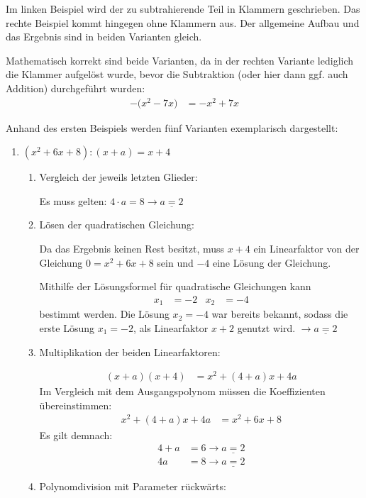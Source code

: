\begin{aufgaben}
\item Im linken Beispiel wird der zu subtrahierende Teil in Klammern geschrieben. Das rechte Beispiel kommt hingegen ohne Klammern aus. Der allgemeine Aufbau und das Ergebnis sind in beiden Varianten gleich.

Mathematisch korrekt sind beide Varianten, da in der rechten Variante lediglich die Klammer aufgelöst wurde, bevor die Subtraktion (oder hier dann ggf. auch Addition) durchgeführt wurden:
\begin{align*}
-\big( x^2-7 x\big) &= -x^2+7x
\end{align*}

\item Anhand des ersten Beispiels werden fünf Varianten exemplarisch dargestellt:
\begin{enumerate}[aa)]
\item $(x^2+6x+8):(x+a) = x+4$
\begin{enumerate}[i:]
\item Vergleich der jeweils letzten Glieder:

Es muss gelten: $4\cdot a = 8 \rightarrow \underline{a = 2}$
\item Lösen der quadratischen Gleichung:

Da das Ergebnis keinen Rest besitzt, muss $x+4$ ein Linearfaktor von der Gleichung  $0=x^2+6x+8$ sein und $-4$ eine Lösung der Gleichung.

Mithilfe der Lösungsformel für quadratische Gleichungen kann
\begin{align*}
x_1&=-2 & x_2&=-4
\end{align*}
bestimmt werden. Die Lösung $x_2=-4$ war bereits bekannt, sodass die erste Lösung $x_1=-2$, als Linearfaktor $x+2$ genutzt wird. $\rightarrow \underline{a=2}$
\item Multiplikation der beiden Linearfaktoren:

\begin{align*}
(x+a)(x+4) &= x^2+(4+a)x+4a
\end{align*}
Im Vergleich mit dem Ausgangspolynom müssen die Koeffizienten übereinstimmen:
\begin{align*}
x^2+(4+a)x+4a&=x^2+6x+8
\end{align*}
Es gilt demnach:
\begin{align*}
4+a&=6 \rightarrow \underline{a=2} \\
4a&=8 \rightarrow \underline{a=2}
\end{align*}

\item Polynomdivision mit Parameter rückwärts:


\end{enumerate}
\end{enumerate}
\end{aufgaben}
